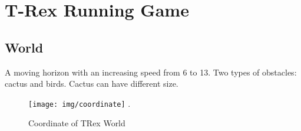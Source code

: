 \documentclass[conference]{IEEEtran}
\begin{document}


%



\section{T-Rex Running Game}

\subsection{World}
A moving horizon with an increasing speed from 6 to 13.
Two types of obstacles: cactus and birds.
Cactus can have different size.
\begin{figure}[ht]
\centering
\texttt{[image: img/coordinate]}
\DeclareGraphicsExtensions.
\caption{Coordinate of TRex World}
\label{fig:coordinate}
\end{figure}
\end{document}
